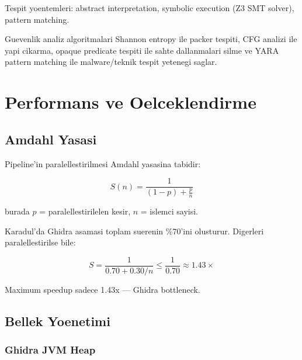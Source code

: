 \documentclass[12pt,a4paper,oneside]{book}
\theoremstyle{definition}
\begin{document}
Tespit yoentemleri: abstract interpretation, symbolic execution (Z3 SMT solver), pattern matching.

\begin{ozet}
Guevenlik analiz algoritmalari Shannon entropy ile packer tespiti, CFG analizi ile yapi cikarma, opaque predicate tespiti ile sahte dallanmalari silme ve YARA pattern matching ile malware/teknik tespit yetene\-gi saglar.
\end{ozet}




\chapter{Performans ve Oelceklendirme}
\label{ch:perf}

\section{Amdahl Yasasi}
\label{sec:amdahl}

Pipeline'in paralellestirilmesi Amdahl yasasina tabidir:

\begin{equation}
S(n) = \frac{1}{(1-p) + \frac{p}{n}}
\label{eq:amdahl}
\end{equation}

burada $p$ = paralellestirilelen kesir, $n$ = islemci sayisi.

Karadul'da Ghidra asamasi toplam suerenin \%70'ini olusturur. Digerleri paralellestir\-ilse bile:

\begin{equation}
S = \frac{1}{0.70 + 0.30/n} \leq \frac{1}{0.70} \approx 1.43\times
\end{equation}

Maximum speedup sadece 1.43x --- Ghidra bottleneck.

\section{Bellek Yoenetimi}
\label{sec:memory}

\subsection{Ghidra JVM Heap}
\end{document}
